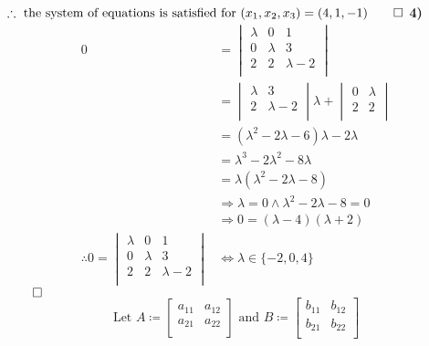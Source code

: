 \documentclass{article}
\begin{document}
$\therefore \text{ the system of equations is satisfied for }(x_1,x_2,x_3)=(4,1,-1)\hfill\qed$
\newpage
\noindent\textbf{4)}
\begin{align*}
    0&=\begin{vmatrix}
        \lambda  & 0 & 1  \\
         0& \lambda  & 3  \\
         2& 2 &\lambda-2    \\
    \end{vmatrix}\\
    &= \begin{vmatrix}
        \lambda  &3   \\
         2&\lambda -2   \\
    \end{vmatrix}\lambda +\begin{vmatrix}
        0 &\lambda    \\
         2&2   \\
    \end{vmatrix}\\
     &=\left(\lambda ^2 -2\lambda -6\right)\lambda -2\lambda\\
    &= \lambda^3 -2\lambda^2 -8\lambda\\
    &= \lambda \left( \lambda ^2 -2\lambda -8 \right)\\
    &\Longrightarrow  \lambda =0\land \lambda ^2-2\lambda -8=0\\
    &\Longrightarrow 0= (\lambda -4)(\lambda +2)\\
    \therefore0=\begin{vmatrix}
        \lambda  & 0 & 1  \\
         0& \lambda  & 3  \\
         2& 2 &\lambda-2    \\
    \end{vmatrix}&\Longleftrightarrow  \lambda \in\{ -2,0,4 \}
\end{align*}$\hfill\qed$\\
\[\text{Let }A\coloneqq \begin{bmatrix}
    a_{11}  & a_{12}   \\
    a_{21}  &  a_{22}  \\
\end{bmatrix}\text{ and }B\coloneqq \begin{bmatrix}
    b_{11}  & b_{12}   \\
     b_{21} &  b_{22}  \\
\end{bmatrix}\]
\end{document}
